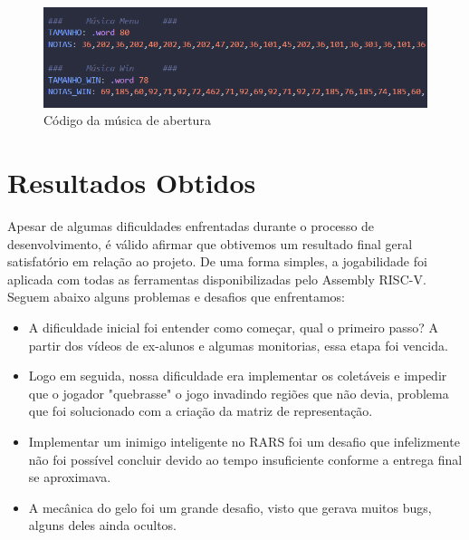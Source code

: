 \documentclass[a4paper]{sbgames}
\begin{document}
 \begin{figure}[H]
  \begin{center}
   \includegraphics[width=1.0\linewidth]{./Figures/musicas.PNG}
  \end{center}
  \caption{Código da música de abertura}
  \label{fig:05}
  \end{figure}
\newpage

\section{Resultados Obtidos}
\label{sec:Resultados}

Apesar de algumas dificuldades enfrentadas durante o processo de desenvolvimento, é válido afirmar que obtivemos um resultado final geral satisfatório em relação ao projeto. De uma forma simples, a jogabilidade foi aplicada com todas as ferramentas disponibilizadas pelo Assembly RISC-V. Seguem abaixo alguns problemas e desafios que enfrentamos:

\begin{itemize}
    \item A dificuldade inicial foi entender como começar, qual o primeiro passo? A partir dos vídeos de ex-alunos e algumas monitorias, essa etapa foi vencida.
    
    \item Logo em seguida, nossa dificuldade era implementar os coletáveis e impedir que o jogador "quebrasse" o jogo invadindo regiões que não devia, problema que foi solucionado com a criação da matriz de representação.
    
    \item Implementar um inimigo inteligente no RARS foi um desafio que infelizmente não foi possível concluir devido ao tempo insuficiente conforme a entrega final se aproximava.
    
    \item A mecânica do gelo foi um grande desafio, visto que gerava muitos bugs, alguns deles ainda ocultos.
\end{itemize}
\end{document}
